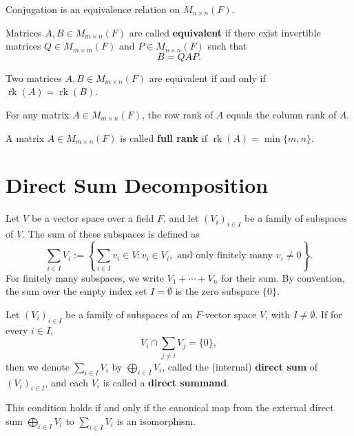 \begin{proposition}
  Conjugation is an equivalence relation on $M_{n \times n}(F)$.
\end{proposition}

\begin{definition}
  Matrices $A, B \in M_{m \times n}(F)$ are called \textbf{equivalent} if there exist invertible matrices $Q \in M_{m \times m}(F)$ and $P \in M_{n \times n}(F)$ such that
  \[
    B = Q A P.
  \]
\end{definition}

\begin{proposition}
  Two matrices $A, B \in M_{m \times n}(F)$ are equivalent if and only if $\operatorname{rk}(A) = \operatorname{rk}(B)$.
\end{proposition}

\begin{theorem}
  For any matrix $A \in M_{m \times n}(F)$, the row rank of $A$ equals the column rank of $A$.
\end{theorem}

\begin{definition}
  A matrix $A \in M_{m \times n}(F)$ is called \textbf{full rank} if $\operatorname{rk}(A) = \min\{m, n\}$.
\end{definition}

\section{Direct Sum Decomposition}

\begin{definition}
  Let $V$ be a vector space over a field $F$, and let $(V_i)_{i \in I}$ be a family of subspaces of $V$. The sum of these subspaces is defined as
  \[
    \sum_{i \in I} V_i := \left\{ \sum_{i \in I} v_i \in V : v_i \in V_i, \text{ and only finitely many } v_i \neq 0 \right\}.
  \]
  For finitely many subspaces, we write $V_1 + \cdots + V_n$ for their sum. By convention, the sum over the empty index set $I = \emptyset$ is the zero subspace $\{0\}$.
\end{definition}

\begin{proposition}
  Let $(V_i)_{i \in I}$ be a family of subspaces of an $F$-vector space $V$, with $I \neq \emptyset$. If for every $i \in I$,
  \[
    V_i \cap \sum_{j \neq i} V_j = \{0\},
  \]
  then we denote $\sum_{i \in I} V_i$ by $\bigoplus_{i \in I} V_i$, called the (internal) \textbf{direct sum} of $(V_i)_{i \in I}$, and each $V_i$ is called a \textbf{direct summand}.

  This condition holds if and only if the canonical map from the external direct sum $\bigoplus_{i \in I} V_i$ to $\sum_{i \in I} V_i$ is an isomorphism.
\end{proposition}

